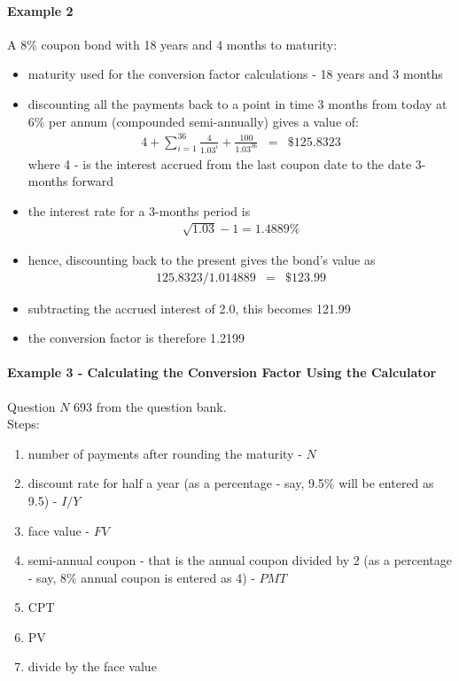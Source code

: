 \paragraph{Example 2}
A 8\% coupon bond with 18 years and 4 months to maturity:\\
\begin{itemize}
	\item maturity used for the conversion factor calculations - 18 years and 3 months
	\item discounting all the payments back to a point in time 3 months from today at 6\% per annum (compounded semi-annually) gives a value of:
	\begin{eqnarray}
		4 + \sum_{i = 1}^{36}\frac{4}{1.03^{i}} + \frac{100}{1.03^{36}} &=& \$125.8323
	\end{eqnarray}
	where 4 - is the interest accrued from the last coupon date to the date 3-months forward
	\item the interest rate for a 3-months period is
	\begin{eqnarray}
		\sqrt{1.03} -1 = 1.4889\%
	\end{eqnarray}
	\item hence, discounting back to the present gives the bond's value as
	\begin{eqnarray}
		125.8323 / 1.014889 &=& \$123.99
	\end{eqnarray}
	\item subtracting the accrued interest of 2.0, this becomes 121.99
	\item the conversion factor is therefore 1.2199
\end{itemize}

\paragraph{Example 3 - Calculating the Conversion Factor Using the Calculator}
Question $N$ 693 from the question bank.\\
Steps:
\begin{enumerate}
	\item number of payments after rounding the maturity - $N$
	\item discount rate for half a year (as a percentage - say, 9.5\% will be entered as 9.5) - $I/Y$
	\item face value - $FV$
	\item semi-annual coupon - that is the annual coupon divided by 2 (as a percentage - say, 8\% annual coupon is entered as 4) - $PMT$
	\item CPT
	\item PV
	\item divide by the face value
\end{enumerate}


